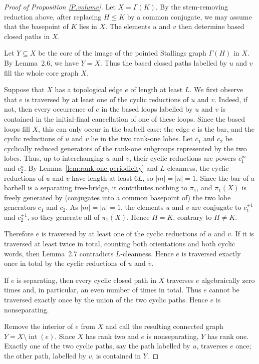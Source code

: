 \documentclass{amsproc}
\begin{document}
\begin{proof}[Proof of Proposition \ref{P.volume}]
Let \(X=\Gamma(K)\).  By the stem-removing reduction above, after replacing
\(H\leq K\) by a common conjugate, we may assume that the basepoint of \(K\)
lies in \(X\).  The elements \(u\) and \(v\) then determine based closed paths
in \(X\).

Let \(Y\subseteq X\) be the core of the image of the pointed Stallings graph
\(\Gamma(H)\) in \(X\).  By Lemma~2.6, we have \(Y=X\).  Thus the based closed
paths labelled by \(u\) and \(v\) fill the whole core graph \(X\).

Suppose that $X$ has a topological edge $e$ of length at least $L$.  We first
observe that $e$ is traversed by at least one of the cyclic reductions of $u$ and
$v$.  Indeed, if not, then every occurrence of $e$ in the based loops labelled by
$u$ and $v$ is contained in the initial-final cancellation of one of these loops.
Since the based loops fill $X$, this can only occur in the barbell case: the edge
$e$ is the bar, and the cyclic reductions of $u$ and $v$ lie in the two rank-one
lobes.  Let $c_1$ and $c_2$ be cyclically reduced generators of the rank-one
subgroups represented by the two lobes.  Thus, up to interchanging $u$ and $v$,
their cyclic reductions are powers $c_1^m$ and $c_2^n$.  By
Lemma~\ref{lem:rank-one-periodicity} and $L$-cleanness, the cyclic reductions of
$u$ and $v$ have length at least $6L$, so $|m| = |n| = 1$.  Since the bar of a
barbell is a separating tree-bridge, it contributes nothing to $\pi_1$, and
$\pi_1(X)$ is freely generated by (conjugates into a common basepoint of) the two
lobe generators $c_1$ and $c_2$.  As $|m| = |n| = 1$, the elements $u$ and $v$ are
conjugate to $c_1^{\pm1}$ and $c_2^{\pm1}$, so they generate all of $\pi_1(X)$.
Hence $H = K$, contrary to $H \ne K$.

Therefore \(e\) is traversed by at least one of the cyclic reductions of \(u\)
and \(v\).  If it is traversed at least twice in total, counting both orientations
and both cyclic words, then Lemma~2.7 contradicts \(L\)-cleanness.  Hence \(e\)
is traversed exactly once in total by the cyclic reductions of \(u\) and \(v\).

If \(e\) is separating, then every cyclic closed path in \(X\) traverses \(e\)
algebraically zero times and, in particular, an even number of times in total.
Thus \(e\) cannot be traversed exactly once by the union of the two cyclic paths.
Hence \(e\) is nonseparating.

Remove the interior of $e$ from $X$ and call the resulting connected graph
$Y=X\setminus \operatorname{int}(e)$. 
Since $X$ has rank two and $e$ is nonseparating, $Y$ has rank one.  Exactly one
of the two cyclic paths, say the path labelled by $u$, traverses $e$ once; the
other path, labelled by $v$, is contained in $Y$.


\end{proof}
\end{document}

